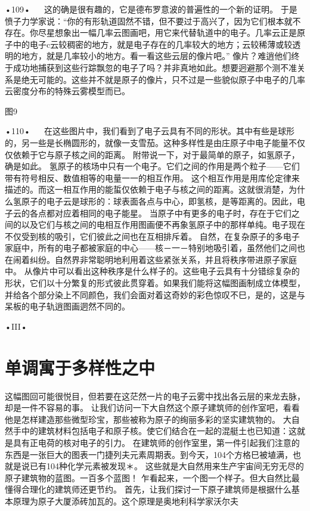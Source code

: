 •109•
  
这的确是很有趣的，它是德布罗意波的普遍性的一个新的证明。
于是愤子力学家说：“你的有形轨道固然不错，但不要过于高兴了，因为它们根本就不存在。你尽星想象出一幅几率云图画吧，用它来代替轨道中的电子。几率云正是原子中的电子c云较稠密的地方，就是电子存在的几率较大的地方；云较稀薄或较透明的地方，就是几率较小的地方。看一看这些云层的像片吧。”
像片？难逍他们终于成功地捕获到这些行踪飘忽的电子了吗？并非真地如此。想要迥避那个测不准关系是绝无可能的。这些并不就是原子的像片，只不过是一些貌似原子中电子的几率云密度分布的特殊云雾模型而已。

 

图9

•110•
  
在这些图片中，我们看到了电子云具有不同的形状。其中有些是球形的，另一些是长椭圆形的，就像一支雪茄。这种多样性是由庄原子中电子能量不仅仅依赖于它与原子核之间的距离。
附带说一下，对于最简单的原子，如氢原子，确是如此。
氢原子的核场中只有一个电子。它们之间的作用是两个粒子——它们带有符号相反、数值相等的电量一一的相互作用。
这个相互作用是用库伦定律来描述的。而这一相互作用的能蜇仅依赖于电子与核之间的距离。这就很消楚，为什么氢原子的电子云是球形的：球表面各点与中心，即氢核，是等距离的。因此，电子云的各点都对应着相同的电子能星。
当原子中有更多的电子时，存在于它们之间的以及它们与核之间的电相互作用图画便不再象氢原子中的那样单纯。电子现在不仅受到核的吸引，它们彼此之间也在互相排斥着。
自然，在复杂原子的多电子家庭中，所有的电子都被家庭的中心——核－一－特别地吸引着，虽然他们之间也在闹着纠纷。自然界非常聪明地利用着这些紧张关系，并且将秩序带进原子家庭中。
从像片中可以看出这种秩序是什么样子的。这些电子云具有十分错综复杂的形状，它们以十分繁复的形式彼此贯穿着。如果我们能将这幅图画制成立体模型，并给各个部分染上不同颜色，我们会面对着这奇妙的彩色惊叹不巳，是的，这是与呆板的电子轨逍图画迵然不同的。

•III•
  
\section{单调寓于多样性之中}

这幅图回可能很悦目，但若要在这茫然一片的电子云雾中找出各云层的来龙去脉，却是一件不容易的事。
让我们访问一下大自然这个原子建筑师的创作室吧，看看他是怎样建造那些微型珍宝，那些被称为原子的绚丽多彩的坚实建筑物的。
大自然手中的建筑材料包括电子和原子核。使它们结合在一起的混艇土也已知道：这就是具有正电荷的核对电子的引力。
在建筑师的创作室里，第一件引起我们注意的东西是一张巨大的图表一门捷列夫元素周期表。到今天，104个方格巳被埴满，也就是说已有104种化学元素被发现＊。
这些就是大自然用来生产宇宙间无穷无尽的原子建筑物的蓝图。一百多个蓝图！
乍看起来，一个图一个样子。但大自然比最懂得合理化的建筑师还更节约。
首先，让我们探讨一下原子建筑师是根据什么基本原理为原子大厦添砖加瓦的。这个原理是奥地利科学家沃尔夫


